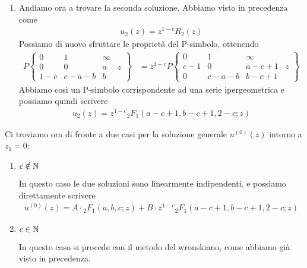 \begin{enumerate}
	\item Andiamo ora a trovare la seconda soluzione. Abbiamo visto in precedenza come 
	\begin{align}
		u_2(z) = z^{1-c}R_2(z)
	\end{align}
	Possiamo di nuovo sfruttare le proprietà del P-simbolo, ottenendo
	\begin{align}
		P\left\{\begin{matrix}
			0   & 1     & \infty & \\
			0   & 0     & a      & z\\
			1-c & c-a-b & b      & 
		\end{matrix}\right\} &= z^{1-c} P\left\{\begin{matrix}
		0   & 1     & \infty & \\
		c-1 & 0     & a-c+1  & z\\
		0   & c-a-b & b-c+1  & 
	\end{matrix}\right\}
	\end{align}
	Abbiamo così un P-simbolo corrispondente ad una serie ipergeometrica e possiamo quindi scrivere
	\begin{align}
		u_2(z) = z^{1-c} {}_2F_1(a-c+1,b-c+1,2-c; z)
	\end{align}	
\end{enumerate}
Ci troviamo ora di fronte a due casi per la soluzione generale $u^{(0)}(z)$ intorno a $z_1=0$:
\begin{enumerate}
	\item $c\notin \mathbb{N}$
	
	In questo caso le due soluzioni sono linearmente indipendenti, e possiamo direttamente scrivere
	\begin{align}
		u^{(0)}(z) = A\cdot {}_2F_1(a,b,c;z) + B \cdot z^{1-c} {}_2F_1(a-c+1,b-c+1,2-c; z)
	\end{align}
	
	\item $c\in \mathbb{N}$
	
	In questo caso si procede con il metodo del wronskiano, come abbiamo già visto in precedenza.

\end{enumerate}

